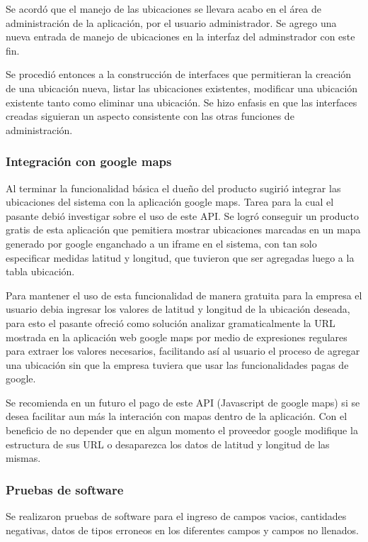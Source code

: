 Se acordó que el manejo de las ubicaciones se llevara acabo en el área de administración de la aplicación, por el usuario administrador. Se agrego una nueva entrada de manejo de ubicaciones en la interfaz del adminstrador con este fin.

Se procedió entonces a la construcción de interfaces que permitieran la creación de una ubicación nueva, listar las ubicaciones existentes, modificar una ubicación existente tanto como eliminar una ubicación. Se hizo enfasis en que las interfaces creadas siguieran un aspecto consistente con las otras funciones de administración.

\subsubsection{Integración con google maps}

Al terminar la funcionalidad básica el dueño del producto sugirió integrar las ubicaciones del sistema con la aplicación google maps. Tarea para la cual el pasante debió investigar sobre el uso de este API. Se logró conseguir un producto gratis de esta aplicación que pemitiera mostrar ubicaciones marcadas en un mapa generado por google enganchado a un iframe en el sistema, con tan solo especificar medidas latitud y longitud, que tuvieron que ser agregadas luego a la tabla ubicación.

Para mantener el uso de esta funcionalidad de manera gratuita para la empresa el usuario debia ingresar los valores de latitud y longitud de la ubicación deseada, para esto el pasante ofreció como solución analizar gramaticalmente la URL mostrada en la aplicación web google maps por medio de expresiones regulares para extraer los valores necesarios, facilitando así al usuario el proceso de agregar una ubicación sin que la empresa tuviera que usar las funcionalidades pagas de google.

Se recomienda en un futuro el pago de este API (Javascript de google maps) si se desea facilitar aun más la interación con mapas dentro de la aplicación. Con el beneficio de no depender que en algun momento el proveedor google modifique la estructura de sus URL o desaparezca los datos de latitud y longitud de las mismas.

\subsubsection{Pruebas de software}

Se realizaron pruebas de software para el ingreso de campos vacios, cantidades negativas, datos de tipos erroneos en los diferentes campos y campos no llenados.






